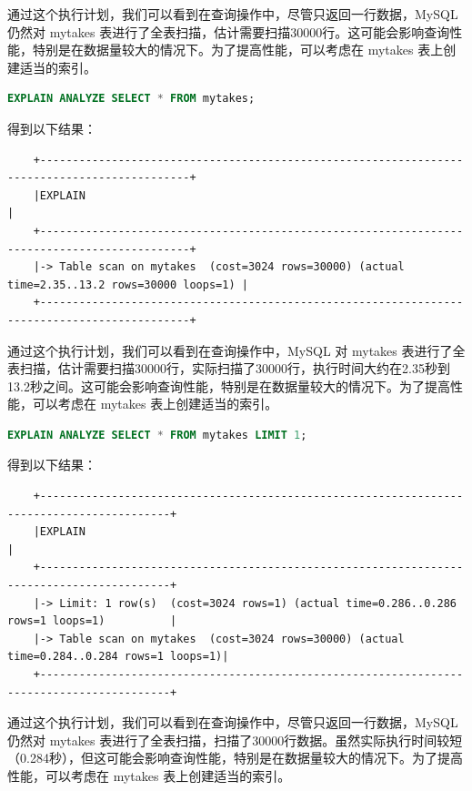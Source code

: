 \documentclass{article}
\begin{document}
	通过这个执行计划，我们可以看到在查询操作中，尽管只返回一行数据，MySQL 仍然对 mytakes 表进行了全表扫描，估计需要扫描30000行。这可能会影响查询性能，特别是在数据量较大的情况下。为了提高性能，可以考虑在 mytakes 表上创建适当的索引。
	
	\begin{lstlisting}[language=sql, title=索引对查询性能的影响, tabsize=4]
	EXPLAIN ANALYZE SELECT * FROM mytakes;
	\end{lstlisting}
	
	得到以下结果：
	
	\begin{verbatim}
	+---------------------------------------------------------------------------------------------+
	|EXPLAIN                                                                                      |
	+---------------------------------------------------------------------------------------------+
	|-> Table scan on mytakes  (cost=3024 rows=30000) (actual time=2.35..13.2 rows=30000 loops=1) |
	+---------------------------------------------------------------------------------------------+
	\end{verbatim}
	
	通过这个执行计划，我们可以看到在查询操作中，MySQL 对 mytakes 表进行了全表扫描，估计需要扫描30000行，实际扫描了30000行，执行时间大约在2.35秒到13.2秒之间。这可能会影响查询性能，特别是在数据量较大的情况下。为了提高性能，可以考虑在 mytakes 表上创建适当的索引。
	
	\begin{lstlisting}[language=sql, title=索引对查询性能的影响, tabsize=4]
	EXPLAIN ANALYZE SELECT * FROM mytakes LIMIT 1;
	\end{lstlisting}
	
	得到以下结果：

	\begin{verbatim}
	+------------------------------------------------------------------------------------------+
	|EXPLAIN                                                                                   |
	+------------------------------------------------------------------------------------------+
	|-> Limit: 1 row(s)  (cost=3024 rows=1) (actual time=0.286..0.286 rows=1 loops=1)          |
	|-> Table scan on mytakes  (cost=3024 rows=30000) (actual time=0.284..0.284 rows=1 loops=1)|
	+------------------------------------------------------------------------------------------+
	\end{verbatim}
	
	通过这个执行计划，我们可以看到在查询操作中，尽管只返回一行数据，MySQL 仍然对 mytakes 表进行了全表扫描，扫描了30000行数据。虽然实际执行时间较短（0.284秒），但这可能会影响查询性能，特别是在数据量较大的情况下。为了提高性能，可以考虑在 mytakes 表上创建适当的索引。
	
\end{document}

